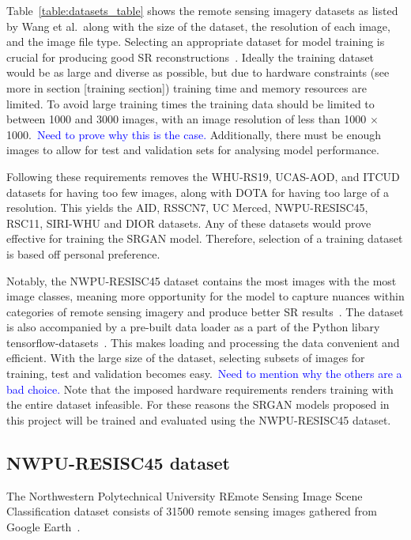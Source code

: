 Table~\ref{table:datasets_table} shows the remote sensing imagery datasets as listed by Wang et al.\ along with the size of the dataset, the resolution of each image, and the image file type. Selecting an appropriate dataset for model training is crucial for producing good SR reconstructions~\cite{ref}. Ideally the training dataset would be as large and diverse as possible, but due to hardware constraints (see more in section [training section]) training time and memory resources are limited. To avoid large training times the training data should be limited to between 1000 and 3000 images, with an image resolution of less than 1000 $\times$ 1000.\ \textcolor{blue}{Need to prove why this is the case.} Additionally, there must be enough images to allow for test and validation sets for analysing model performance.

Following these requirements removes the WHU-RS19, UCAS-AOD, and ITCUD datasets for having too few images, along with DOTA for having too large of a resolution. This yields the AID, RSSCN7, UC Merced, NWPU-RESISC45, RSC11, SIRI-WHU and DIOR datasets. Any of these datasets would prove effective for training the SRGAN model. Therefore, selection of a training dataset is based off personal preference. 

Notably, the NWPU-RESISC45 dataset contains the most images with the most image classes, meaning more opportunity for the model to capture nuances within categories of remote sensing imagery and produce better SR results~\cite{ref}. The dataset is also accompanied by a pre-built data loader as a part of the Python libary tensorflow-datasets~\cite{ref}. This makes loading and processing the data convenient and efficient. With the large size of the dataset, selecting subsets of images for training, test and validation becomes easy.\ \textcolor{blue}{Need to mention why the others are a bad choice.} Note that the imposed hardware requirements renders training with the entire dataset infeasible. For these reasons the SRGAN models proposed in this project will be trained and evaluated using the NWPU-RESISC45 dataset.

\subsection{NWPU-RESISC45 dataset}\label{subsec:resisc45}
The Northwestern Polytechnical University REmote Sensing Image Scene Classification dataset consists of 31500 remote sensing images gathered from Google Earth~\cite{resisc45}. 

